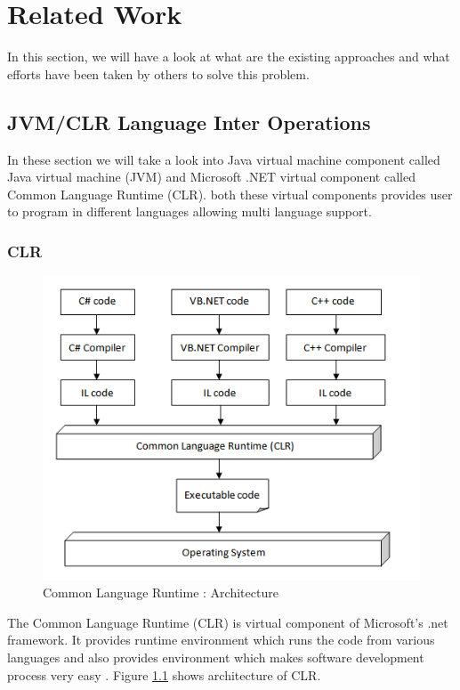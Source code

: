 \chapter{Related Work}
In this section, we will have a look at what are the existing approaches and what efforts
have been taken by others to solve this problem.

\section{JVM/CLR Language Inter Operations}

In these section we will take a look into Java virtual machine component called Java virtual machine (JVM) and Microsoft .NET virtual component called Common Language Runtime (CLR). both these virtual components provides user to program in different languages allowing multi language support. 

\subsection{CLR}

\begin{figure}[ht]
	\begin{center}
		\includegraphics[width=\linewidth]{./images/clrArchitecture.png}
	\end{center}
	\caption{Common Language Runtime : Architecture}
	\label{fig:clrarchitecture}
\end{figure}

The Common Language Runtime (CLR) is virtual component of Microsoft's .net framework. It provides runtime environment which runs the code from various languages and also provides environment which makes software development process very easy \cite{Kennedy:2001:DIG:381694.378797}. Figure \ref{fig:clrarchitecture} shows architecture of CLR.

